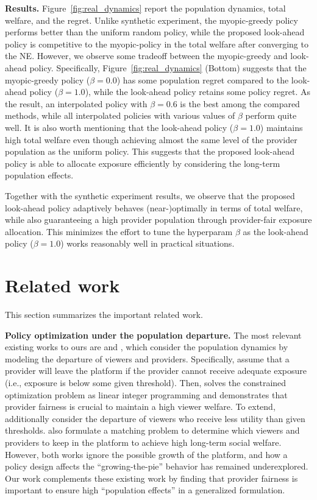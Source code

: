 \textbf{Results.} \;
Figure~\ref{fig:real_dynamics} report the population dynamics, total welfare, and the regret. Unlike synthetic experiment, the myopic-greedy policy performs better than the uniform random policy, while the proposed look-ahead policy is competitive to the myopic-policy in the total welfare after converging to the NE. However, we observe some tradeoff between the myopic-greedy and look-ahead policy. Specifically, Figure~\ref{fig:real_dynamics} (Bottom) suggests that the myopic-greedy policy ($\beta=0.0$) has some population regret compared to the look-ahead policy ($\beta=1.0$), while the look-ahead policy retains some policy regret. As the result, an interpolated policy with $\beta=0.6$ is the best among the compared methods, while all interpolated policies with various values of $\beta$ perform quite well. It is also worth mentioning that the look-ahead policy ($\beta=1.0$) maintains high total welfare even though achieving almost the same level of the provider population as the uniform policy. This suggests that the proposed look-ahead policy is able to allocate exposure efficiently by considering the long-term population effects.

Together with the synthetic experiment results, we observe that the proposed look-ahead policy adaptively behaves (near-)optimally in terms of total welfare, while also guaranteeing a high provider population through provider-fair exposure allocation. This minimizes the effort to tune the hyperparam $\beta$ as the look-ahead policy ($\beta=1.0$) works reasonably well in practical situations. 

\section{Related work} \label{app:related_work}

This section summarizes the important related work.

\textbf{Policy optimization under the population departure.} \quad The most relevant existing works to ours are \citet{mladenov2020optimizing} and \citet{huttenlocher2023matching}, which consider the population dynamics by modeling the departure of viewers and providers. Specifically, \citet{mladenov2020optimizing} assume that a provider will leave the platform if the provider cannot receive adequate exposure (i.e., exposure is below some given threshold). Then, \citet{mladenov2020optimizing} solves the constrained optimization problem as linear integer programming and demonstrates that provider fairness is crucial to maintain a high viewer welfare. To extend, \citet{huttenlocher2023matching} additionally consider the departure of viewers who receive less utility than given thresholds. \citet{huttenlocher2023matching} also formulate a matching problem to determine which viewers and providers to keep in the platform to achieve high long-term social welfare. However, both works ignore the possible growth of the platform, and how a policy design affects the ``growing-the-pie'' behavior has remained underexplored. Our work complements these existing work by finding that provider fairness is important to ensure high ``population effects'' in a generalized formulation.

